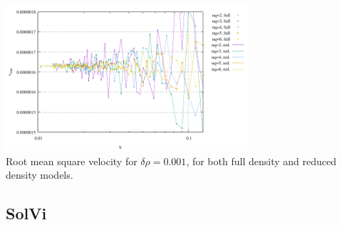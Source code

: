 \begin{center}
\includegraphics[width=9cm]{python_codes/fieldstone_80/results/sphere/vrms}\\
{\captionfont Root mean square velocity for $\delta \rho=0.001$, for both full density and reduced 
density models.}
\end{center}


\subsection*{SolVi}

